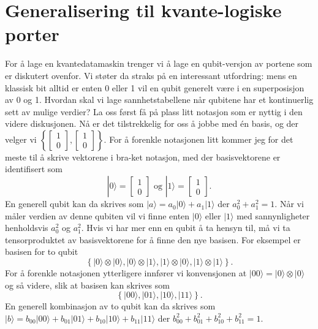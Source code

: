 \section{Generalisering til kvante-logiske porter}
For å lage en kvantedatamaskin trenger vi å lage en qubit-versjon av portene som er diskutert ovenfor. Vi støter da straks på en interessant utfordring: mens en klassisk bit alltid er enten 0 eller 1 vil en qubit generelt være i en superposisjon av 0 og 1. Hvordan skal vi lage sannhetstabellene når qubitene har et kontinuerlig sett av mulige verdier? La oss først få på plass litt notasjon som er nyttig i den videre diskusjonen. Nå er det tilstrekkelig for oss å jobbe med \'en basis, og der velger vi $\left\{ \left[\begin{array}{cc}1\\0\end{array}\right], \left[\begin{array}{cc}1\\0\end{array}\right] \right\}$. For å forenkle notasjonen litt kommer jeg for det meste til å skrive vektorene i bra-ket notasjon, med der basisvektorene er identifisert som
\begin{displaymath}
	|0\rangle = \left[\begin{array}{cc}1\\0\end{array}\right] \text{ og } |1\rangle =  \left[\begin{array}{cc}1\\0\end{array}\right].
\end{displaymath}
En generell qubit kan da skrives som $|a\rangle = a_0|0\rangle + a_1|1\rangle$ der $a_0^2 + a_1^2 = 1$. Når vi måler verdien av denne qubiten vil vi finne enten $|0\rangle$ eller $|1\rangle$ med sannynligheter henholdsvis $a_0^2$ og $a_1^2$. Hvis vi har mer enn en qubit å ta hensyn til, må vi ta tensorproduktet av basisvektorene for å finne den nye basisen. For eksempel er basisen for to qubit
\begin{displaymath}
	\left\{ |0\rangle\otimes|0\rangle,  |0\rangle\otimes|1\rangle,  |1\rangle\otimes|0\rangle,  |1\rangle\otimes|1\rangle  \right\}.
\end{displaymath}
For å forenkle notasjonen ytterligere innfører vi konvensjonen at $|00\rangle = |0\rangle\otimes|0\rangle$ og så videre, slik at basisen kan skrives som
\begin{displaymath}
	\left\{ |00\rangle,  |01\rangle,  |10\rangle,  |11\rangle  \right\}.
\end{displaymath}
En generell kombinasjon av to qubit kan da skrives som $|b\rangle = b_{00}|00\rangle + b_{01}|01\rangle + b_{10}|10\rangle + b_{11}|11\rangle$ der $b_{00}^2 + b_{01}^2 + b_{10}^2 + b_{11}^2 = 1$. 

